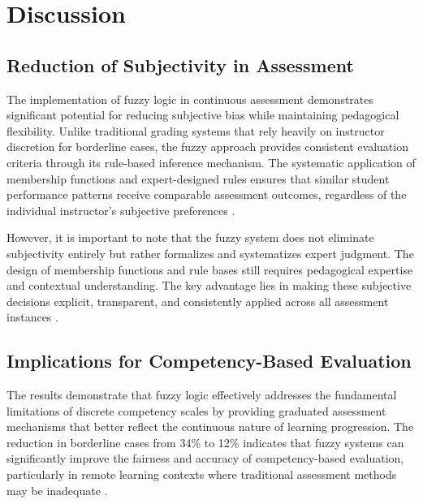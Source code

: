 
\section{Discussion}

\subsection{Reduction of Subjectivity in Assessment}

The implementation of fuzzy logic in continuous assessment demonstrates significant potential for reducing subjective bias while maintaining pedagogical flexibility. Unlike traditional grading systems that rely heavily on instructor discretion for borderline cases, the fuzzy approach provides consistent evaluation criteria through its rule-based inference mechanism. The systematic application of membership functions and expert-designed rules ensures that similar student performance patterns receive comparable assessment outcomes, regardless of the individual instructor's subjective preferences \cite{Ahmed2023, Chen2023}.

However, it is important to note that the fuzzy system does not eliminate subjectivity entirely but rather formalizes and systematizes expert judgment. The design of membership functions and rule bases still requires pedagogical expertise and contextual understanding. The key advantage lies in making these subjective decisions explicit, transparent, and consistently applied across all assessment instances \cite{Kumar2023}.

\subsection{Implications for Competency-Based Evaluation}

The results demonstrate that fuzzy logic effectively addresses the fundamental limitations of discrete competency scales by providing graduated assessment mechanisms that better reflect the continuous nature of learning progression. The reduction in borderline cases from 34\% to 12\% indicates that fuzzy systems can significantly improve the fairness and accuracy of competency-based evaluation, particularly in remote learning contexts where traditional assessment methods may be inadequate \cite{Garcia2024}.

